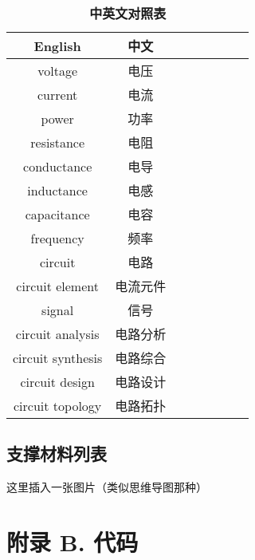 \documentclass[UTF8]{report}
\theoremstyle{MyLineTheoremStyle} %
\theoremstyle{MyBlockTheoremStyle} %
\theoremstyle{MySubsubsectionStyle} %
\begin{document}
\begin{multicols}{2}
   \begin{table}[H]\centering
       \caption{\textbf{中英文对照表}}
       \begin{tabular}{cccccccc}\toprule
           English & 中文 \\
           \midrule
           voltage            & 电压 \\
           current            & 电流 \\
           power              & 功率 \\
           resistance         & 电阻 \\
           conductance        & 电导 \\
           inductance         & 电感 \\
           capacitance        & 电容 \\
           frequency          & 频率 \\
           circuit            & 电路 \\
           circuit element    & 电流元件 \\
           signal             & 信号 \\
           circuit analysis   & 电路分析 \\
           circuit synthesis  & 电路综合 \\
           circuit design     & 电路设计 \\
           circuit topology   & 电路拓扑 \\
           \bottomrule
       \end{tabular}
   \end{table}
\end{multicols} 
    
\section{支撑材料列表} 

\begin{center}
 这里插入一张图片（类似思维导图那种）
\end{center}


\chapter*{附录 B. 代码}   
\thispagestyle{fancy} 
\setcounter{section}{0}   
\renewcommand\thesection{B.\arabic{section}}   
\renewcommand{\thefigure}{B.\arabic{figure}} 
\renewcommand{\thetable}{B.\arabic{table}}
\end{document}
